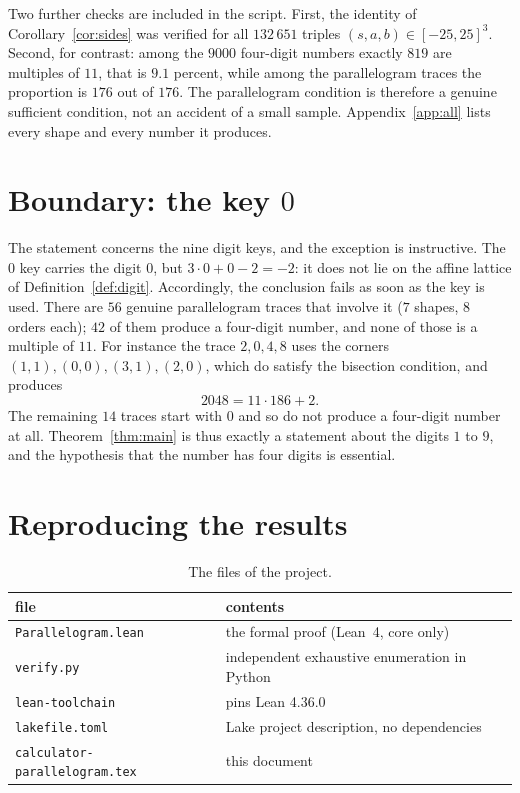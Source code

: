 \documentclass[11pt,a4paper]{article}
\theoremstyle{definition}
\theoremstyle{remark}
\newcommand{\code}[1]{\texttt{#1}}
\begin{document}
Two further checks are included in the script. First, the identity of
Corollary~\ref{cor:sides} was verified for all $132\,651$ triples
$(s,a,b)\in[-25,25]^3$. Second, for contrast: among the $9000$ four-digit numbers
exactly $819$ are multiples of $11$, that is $9.1$ percent, while among the
parallelogram traces the proportion is $176$ out of $176$. The parallelogram
condition is therefore a genuine sufficient condition, not an accident of a small
sample. Appendix~\ref{app:all} lists every shape and every number it produces.

\section{Boundary: the key $0$}
\label{sec:zero}

The statement concerns the nine digit keys, and the exception is instructive. The
$0$ key carries the digit $0$, but $3\cdot 0+0-2=-2$: it does not lie on the affine
lattice of Definition~\ref{def:digit}. Accordingly, the conclusion fails as soon as
the key is used. There are $56$ genuine parallelogram traces that involve it ($7$
shapes, $8$ orders each); $42$ of them produce a four-digit number, and none of those
is a multiple of $11$. For instance the trace $2,0,4,8$ uses the corners
$(1,1),(0,0),(3,1),(2,0)$, which do satisfy the bisection condition, and produces
\[
2048=11\cdot 186+2 .
\]
The remaining $14$ traces start with $0$ and so do not produce a four-digit number at
all. Theorem~\ref{thm:main} is thus exactly a statement about the digits $1$ to $9$,
and the hypothesis that the number has four digits is essential.

\section{Reproducing the results}
\label{sec:reproduce}

\begin{table}[htbp]
\centering
\caption{The files of the project.}
\label{tab:files}
\small
\begin{tabular}{@{}ll@{}}
\toprule
file & contents\\
\midrule
\code{Parallelogram.lean} & the formal proof (Lean~4, core only)\\
\code{verify.py} & independent exhaustive enumeration in Python\\
\code{lean-toolchain} & pins Lean 4.36.0\\
\code{lakefile.toml} & Lake project description, no dependencies\\
\code{calculator-parallelogram.tex} & this document\\
\bottomrule
\end{tabular}
\end{table}
\end{document}
